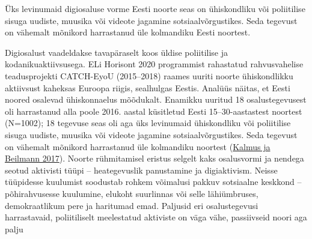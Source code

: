 \documentclass[estonian,]{article}
\begin{document}
\begin{blockquote-left}
Üks levinumaid digiosaluse vorme Eesti noorte seas on ühiskondliku või
poliitilise sisuga uudiste, muusika või videote jagamine
sotsiaalvõrgustikes. Seda tegevust on vähemalt mõnikord harrastanud üle
kolmandiku Eesti noortest.
\end{blockquote-left}

Digiosalust vaadeldakse tavapäraselt koos üldise poliitilise ja kodanikuaktiivsusega. ELi Horisont 2020 programmist rahastatud rahvusvahelise teadusprojekti CATCH-EyoU (2015--2018) raames uuriti noorte ühiskondlikku aktiivsust kaheksas Euroopa riigis, sealhulgas Eestis. Analüüs näitas, et Eesti noored osalevad ühiskonnaelus mõõdukalt. Enamikku uuritud 18 osalustegevusest oli harrastanud alla poole 2016. aastal küsitletud Eesti 15--30-aastastest noortest (N=1002); 18 tegevuse seas oli aga üks levinumaid ühiskondliku või poliitilise sisuga uudiste, muusika või videote jagamine sotsiaalvõrgustikes. Seda tegevust on vähemalt mõnikord harrastanud üle kolmandiku noortest (\protect\hyperlink{Kalmus2017}{Kalmus ja Beilmann 2017}). Noorte rühmitamisel eristus selgelt kaks osalusvormi ja nendega seotud aktivisti tüüpi -- heategevuslik panustamine ja digiaktivism. Neisse tüüpidesse kuulumist soodustab rohkem võimalusi pakkuv sotsiaalne keskkond -- põhirahvusesse kuulumine, elukoht suurlinnas või selle lähiümbruses, demokraatlikum pere ja haritumad emad. Paljusid eri osalustegevusi harrastavaid, poliitiliselt meelestatud aktiviste on väga vähe, passiivseid noori aga palju
\end{document}
